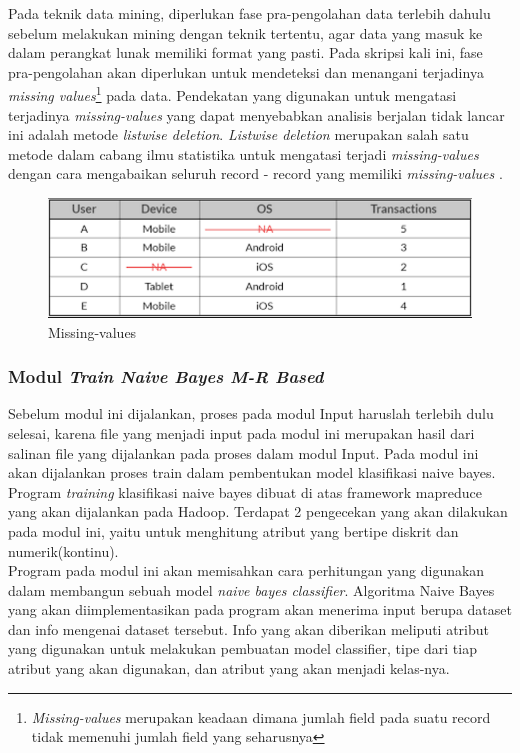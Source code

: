 Pada teknik data mining, diperlukan fase pra-pengolahan data terlebih dahulu sebelum melakukan mining dengan teknik tertentu, agar data yang masuk ke dalam perangkat lunak memiliki format yang pasti. Pada skripsi kali ini, fase pra-pengolahan akan diperlukan untuk mendeteksi dan menangani terjadinya \textit{missing values}\footnote{\textit{Missing-values} merupakan keadaan dimana jumlah field pada suatu record tidak memenuhi jumlah field yang seharusnya} pada data. Pendekatan yang digunakan untuk mengatasi terjadinya \textit{missing-values} yang dapat menyebabkan analisis berjalan tidak lancar ini adalah metode \textit{listwise deletion}. \textit{Listwise deletion} merupakan salah satu metode dalam cabang ilmu statistika untuk mengatasi terjadi \textit{missing-values} dengan cara mengabaikan seluruh record - record yang memiliki \textit{missing-values} \cite{PeughMissing:2004}.

\begin{figure}[ht]
	\centering
	\includegraphics[scale=0.5]{GambarIO/Missing-values}
	\caption[Missing-values]{Missing-values \cite{MissingVal:2016}} 
	\label{fig:Missing-values}
\end{figure}

\subsubsection{Modul \textit{Train Naive Bayes M-R Based}}

Sebelum modul ini dijalankan, proses pada modul Input haruslah terlebih dulu selesai, karena file yang menjadi input pada modul ini merupakan hasil dari salinan file yang dijalankan pada proses dalam modul Input. Pada modul ini akan dijalankan proses train dalam pembentukan model klasifikasi naive bayes. Program \textit{training} klasifikasi naive bayes dibuat di atas framework mapreduce yang akan dijalankan pada Hadoop. Terdapat 2 pengecekan yang akan dilakukan pada modul ini, yaitu untuk menghitung atribut yang bertipe diskrit dan numerik(kontinu).\\
	Program pada modul ini akan memisahkan cara perhitungan yang digunakan dalam membangun sebuah model \textit{naive bayes classifier}. Algoritma Naive Bayes yang akan diimplementasikan pada program akan menerima input berupa dataset dan info mengenai dataset tersebut. Info yang akan diberikan meliputi atribut yang digunakan untuk melakukan pembuatan model classifier, tipe dari tiap atribut yang akan digunakan, dan atribut yang akan menjadi kelas-nya.
	
